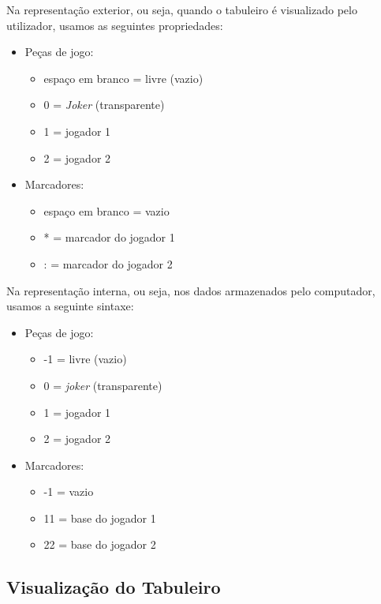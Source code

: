 \documentclass[a4paper]{article}
\begin{document}
Na representação exterior, ou seja, quando o tabuleiro é visualizado pelo utilizador, usamos as seguintes propriedades:
\begin{multicols}{2}
	\begin{itemize}
		\item Peças de jogo:
		\begin{itemize}
			\item espaço em branco = livre (vazio)
			\item 0 = \textit{Joker} (transparente)
			\item 1 = jogador 1
			\item 2	= jogador 2
		\end{itemize}
		
		\columnbreak
		
		\item Marcadores:
		\begin{itemize}
			\item espaço em branco = vazio
			\item * = marcador do jogador 1
			\item : = marcador do jogador 2
		\end{itemize}
	\end{itemize}
\end{multicols}
	
Na representação interna, ou seja, nos dados armazenados pelo computador, usamos a seguinte sintaxe:
\begin{multicols}{2}
	\begin{itemize}
		\item Peças de jogo:
		\begin{itemize}
			\item -1 = livre (vazio)
			\item 0 = \textit{joker} (transparente)
			\item 1 = jogador 1
			\item 2 = jogador 2
		\end{itemize}
		\item Marcadores:
		\begin{itemize}
			\item -1 = vazio
			\item 11 = base do jogador 1
			\item 22 = base do jogador 2
		\end{itemize}
	\end{itemize}
\end{multicols}


\subsection{Visualização do Tabuleiro\newline}
\end{document}
